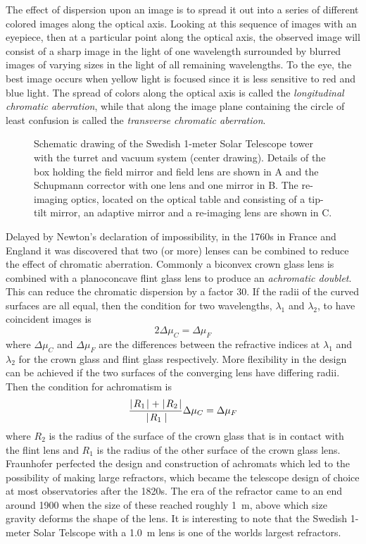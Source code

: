 \documentclass{article}
\def\labs{\mid\!}
\def\rabs{\!\mid}
\begin{document}
The effect of dispersion upon an image is to spread it out into a series of
different colored images along the optical axis. Looking at this sequence of
 images with an eyepiece, then at a particular point along the optical axis, the
observed image will consist of a sharp image in the light of one wavelength
surrounded by blurred images of varying sizes in the light of all remaining 
wavelengths. To the eye, the best image occurs when yellow light is focused 
since it is less sensitive to red and blue light.
The spread of colors along the optical axis is called the
{\it longitudinal chromatic aberration}, while that along the image plane
containing the circle of least confusion is called the {\it transverse
chromatic aberration}.

\begin{figure}[th!]
  \hfil{}\hfil
  \caption{Schematic drawing of the Swedish 1-meter Solar Telescope tower 
with the turret and vacuum system (center drawing). Details of the box 
holding the field mirror and field lens are shown in A and the Schupmann 
corrector with one lens and one mirror in B. The re-imaging optics, located on
the optical table and consisting of a tip-tilt mirror, an adaptive mirror 
and a re-imaging lens are shown in C.}
  \label{fig:sst-design}
\end{figure}

Delayed by Newton's declaration of impossibility, in the 1760s in France 
and England it was discovered that 
two (or more) lenses can be combined to reduce the effect of chromatic 
aberration. Commonly a biconvex crown glass lens is combined with a 
planoconcave flint glass lens to produce an {\it achromatic doublet}. This can 
reduce the chromatic dispersion by a factor 30. If the radii of the 
curved surfaces are all equal, then the condition for two wavelengths,
$\lambda_1$ and $\lambda_2$, to have coincident images is 
\[
2\Delta\mu_C=\Delta\mu_F
\]
where $\Delta\mu_C$ and $\Delta\mu_F$ are the differences between the 
refractive indices at $\lambda_1$ and $\lambda_2$ for the crown glass and
flint glass respectively. More flexibility in the design can be achieved 
if the two surfaces of the converging lens have differing radii. Then the
condition for achromatism is
\[
{\labs R_1\rabs+\labs R_2\rabs\over\labs R_1\labs}\Delta\mu_C=\Delta\mu_F
\]
where $R_2$ is the radius of the surface of the crown glass that is in 
contact with the flint lens and $R_1$ is the radius of the other surface
of the crown glass lens. Fraunhofer perfected the design and construction
of achromats which led to the possibility of making large refractors, which became 
the telescope design of choice at most observatories after the 1820s.
The era of the refractor came to an end around 1900 when the size of these
reached roughly 1~m, above which size gravity deforms the shape of the lens. It is 
interesting to note that the Swedish 1-meter Solar Telscope with a 1.0~m lens is
one of the worlds largest refractors.
\end{document}

